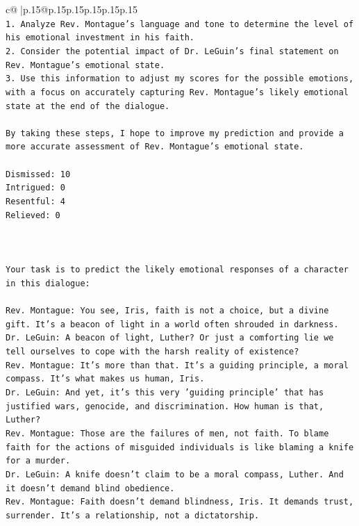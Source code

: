 \documentclass{article}
\begin{document}
{\begin{supertabular}{c@{$\;$}|p{.15\linewidth}@{}p{.15\linewidth}p{.15\linewidth}p{.15\linewidth}p{.15\linewidth}p{.15\linewidth}}
{{{\\ 
\texttt{1. Analyze Rev. Montague's language and tone to determine the level of his emotional investment in his faith.} \\
\texttt{2. Consider the potential impact of Dr. LeGuin's final statement on Rev. Montague's emotional state.} \\
\texttt{3. Use this information to adjust my scores for the possible emotions, with a focus on accurately capturing Rev. Montague's likely emotional state at the end of the dialogue.} \\
\\ 
\texttt{By taking these steps, I hope to improve my prediction and provide a more accurate assessment of Rev. Montague's emotional state.} \\
\\ 
\texttt{Dismissed: 10} \\
\texttt{Intrigued: 0} \\
\texttt{Resentful: 4} \\
\texttt{Relieved: 0} \\
\\ 
\\ 
\\ 
\texttt{Your task is to predict the likely emotional responses of a character in this dialogue:} \\
\\ 
\texttt{Rev. Montague: You see, Iris, faith is not a choice, but a divine gift. It's a beacon of light in a world often shrouded in darkness.} \\
\texttt{Dr. LeGuin: A beacon of light, Luther? Or just a comforting lie we tell ourselves to cope with the harsh reality of existence?} \\
\texttt{Rev. Montague: It's more than that. It's a guiding principle, a moral compass. It's what makes us human, Iris.} \\
\texttt{Dr. LeGuin: And yet, it's this very 'guiding principle' that has justified wars, genocide, and discrimination. How human is that, Luther?} \\
\texttt{Rev. Montague: Those are the failures of men, not faith. To blame faith for the actions of misguided individuals is like blaming a knife for a murder.} \\
\texttt{Dr. LeGuin: A knife doesn't claim to be a moral compass, Luther. And it doesn't demand blind obedience.} \\
\texttt{Rev. Montague: Faith doesn't demand blindness, Iris. It demands trust, surrender. It's a relationship, not a dictatorship.} \\
}}}
\end{supertabular}}
\end{document}

